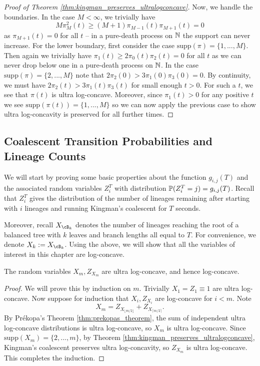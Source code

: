 \begin{subappendices}
\begin{proof}[Proof of Theorem \ref{thm:kingman_preserves_ultralogconcave}]
    Now, we handle the boundaries. In the case $M < \infty$, we trivially have
        \[M\pi^2_M(t) \geq (M+1)\pi_{M-1}(t)\pi_{M+1}(t) = 0\]
    \noindent as $\pi_{M+1}(t) = 0$ for all $t$ -- in a pure-death process on $\N$ the support can never increase. For the lower boundary, first consider the case $\mathrm{supp}(\pi) = \{1,..., M\}$. Then again we trivially have $\pi_1(t) \geq 2\pi_0(t)\pi_2(t) = 0$ for all $t$ as we can never drop below one in a pure-death process on $\N$. In the case $\mathrm{supp}(\pi) = \{2,..., M\}$ note that $2\pi_2(0) > 3\pi_1(0)\pi_3(0) = 0$. By continuity, we must have $2\pi_2(t) > 3\pi_1(t) \pi_3(t)$ for small enough $t > 0$. For such a $t$, we see that $\pi(t)$ is ultra log-concave. Moreover, since $\pi_1(t) > 0$ for any positive $t$ we see $\mathrm{supp}(\pi(t)) = \{1,..., M\}$ so we can now apply the previous case to show ultra log-concavity is preserved for all further times.
\end{proof}


\subsection{Coalescent Transition Probabilities and Lineage Counts}
\label{app:basic-coalescent-properties}

We will start by proving some basic properties about the function $g_{i,j}(T)$ and the associated random variables $Z_i^T$ with distribution $\P(Z_i^T = j) = g_{i,j}(T)$. Recall that $Z^T_i$ gives the distribution of the number of lineages remaining after starting with $i$ lineages and running Kingman's coalescent for $T$ seconds.

Moreover, recall $X_{\cB_k}$ denotes the number of lineages reaching the root of a balanced tree with $k$ leaves and branch lengths all equal to $T$. For convenience, we denote $X_k := X_{\cB_k}$. Using the above, we will show that all the variables of interest in this chapter are log-concave.

\begin{lemma}
\label{lem:xm_zxm_are_ultra_log_concave}
The random variables $X_m, Z_{X_m}$ are ultra log-concave, and hence log-concave.
\end{lemma}

\begin{proof}
    We will prove this by induction on $m$. Trivially $X_1 = Z_1 \equiv 1$ are ultra log-concave. Now suppose for induction that $X_i, Z_{X_i}$ are log-concave for $i < m$. Note
    \[X_m = Z_{X_{\lfloor m/2 \rfloor}} + Z_{X_{\lceil m/2\rceil}}.\]
    \noindent By Pr\'ekopa's Theorem \ref{thm:prekopas_theorem}, the sum of independent ultra log-concave distributions is ultra log-concave, so $X_m$ is ultra log-concave. Since $\mathrm{supp}(X_m) = \{2,..., m\}$, by Theorem \ref{thm:kingman_preserves_ultralogconcave}, Kingman's coalescent preserves ultra log-concavity, so $Z_{X_m}$ is ultra log-concave. This completes the induction.
\end{proof}


\end{subappendices}

